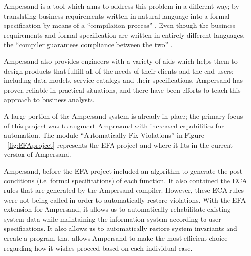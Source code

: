 Ampersand is a tool which aims to address this problem in a different way; by
translating business requirements written in natural language into a formal
specification by means of a ``compilation process'' \citep{derFun}. 
Even though the business requirements and formal specification are written in
entirely different languages, the ``compiler guarantees compliance between the
two'' \citep[2]{derFun}. 

Ampersand also provides engineers with a variety of aids which
helps them to design products that fulfill all of the needs of their clients and
the end-users; including data models, service catalogs and their
specifications. Ampersand has proven reliable in practical situations, and there have been
efforts to teach this approach to business analysts. 

 A large portion of the Ampersand system is already in place; the primary focus of this project was to
augment Ampersand with increased capabilities for automation. The module ``Automatically Fix Violations'' in Figure ~\ref{fig:EFAproject} represents the EFA project and where it fits in the current version of Ampersand.

Ampersand, before the EFA project included an algorithm to generate the
post-conditions (i.e. formal specifications) of each function. It also contained the ECA rules that are generated by the Ampersand compiler. 
However, these ECA rules were not being called in order to automatically restore violations.
 With the EFA extension for Ampersand, it allows us to automatically rehabilitate existing system data while 
maintaining the information system according to user specifications. It also allows us to
automatically restore system invariants and create a program that allows 
Ampersand to make the most efficient choice regarding how it wishes proceed 
based on each individual case.


